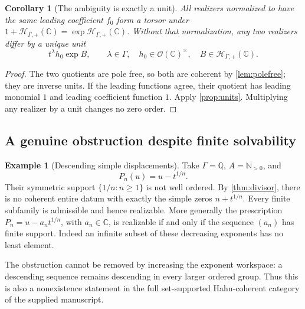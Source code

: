\documentclass[11pt,letterpaper]{article}
\newtheorem{corollary}[theorem]{Corollary}
\theoremstyle{definition}
\newtheorem{example}[theorem]{Example}
\theoremstyle{remark}
\newcommand{\C}{\mathbb C}
\newcommand{\N}{\mathbb N}
\newcommand{\Q}{\mathbb Q}
\newcommand{\OO}{\mathcal O}
\newcommand{\HP}{\mathscr H_{\Gamma,+}}
\numberwithin{equation}{section}
\begin{document}
\begin{corollary}[The ambiguity is exactly a unit]\label{cor:divisortorsor}
All realizers normalized to have the same leading coefficient $f_0$ form a torsor under $1+\HP(\C)=\exp\HP(\C)$. Without that normalization, any two realizers differ by a unique unit
\[
 t^\lambda h_0\exp B,
 \qquad \lambda\in\Gamma,\quad
 h_0\in\OO(\C)^\times,\quad B\in\HP(\C).
\]
\end{corollary}
\begin{proof}
The two quotients are pole free, so both are coherent by \cref{lem:polefree}; they are inverse units. If the leading functions agree, their quotient has leading monomial $1$ and leading coefficient function $1$. Apply \cref{prop:units}. Multiplying any realizer by a unit changes no zero order.
\end{proof}

\subsection{A genuine obstruction despite finite solvability}
\begin{example}[Descending simple displacements]\label{ex:descending}
Take $\Gamma=\Q$, $A=\N_{>0}$, and
\[
 P_n(u)=u-t^{1/n}.
\]
Their symmetric support $\{1/n:n\ge1\}$ is not well ordered. By \cref{thm:divisor}, there is no coherent entire datum with exactly the simple zeros $n+t^{1/n}$. Every finite subfamily is admissible and hence realizable. More generally the prescription $P_n=u-a_nt^{1/n}$, with $a_n\in\C$, is realizable if and only if the sequence $(a_n)$ has finite support. Indeed an infinite subset of these decreasing exponents has no least element.
\end{example}
The obstruction cannot be removed by increasing the exponent workspace: a descending sequence remains descending in every larger ordered group. Thus this is also a nonexistence statement in the full set-supported Hahn-coherent category of the supplied manuscript.
\end{document}
